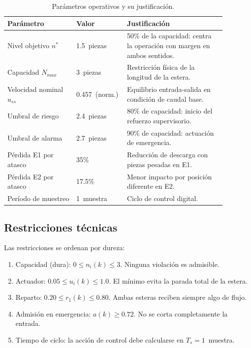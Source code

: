 \begin{table}[H]
\centering
\small
\caption{Parámetros operativos y su justificación.}
\label{tab:params_op}
\begin{tabular}{@{}P{0.30\linewidth}P{0.15\linewidth}P{0.43\linewidth}@{}}
\toprule
Parámetro & Valor & Justificación \\ \midrule
Nivel objetivo $n^*$ & 1.5~piezas & 50\% de la capacidad: centra la operación con margen en ambos sentidos.\\
Capacidad $N_{max}$ & 3~piezas & Restricción física de la longitud de la estera.\\
Velocidad nominal $u_{ss}$ & 0.457~(norm.) & Equilibrio entrada-salida en condición de caudal base.\\
Umbral de riesgo & 2.4~piezas & 80\% de capacidad: inicio del refuerzo supervisorio.\\
Umbral de alarma & 2.7~piezas & 90\% de capacidad: actuación de emergencia.\\
Pérdida E1 por atasco & 35\% & Reducción de descarga con piezas pesadas en E1.\\
Pérdida E2 por atasco & 17.5\% & Menor impacto por posición diferente en E2.\\
Período de muestreo & 1~muestra & Ciclo de control digital.\\
\bottomrule
\end{tabular}
\end{table}

\subsection*{Restricciones técnicas}

Las restricciones se ordenan por dureza:

\begin{enumerate}
  \item Capacidad (dura): $0 \leq n_i(k) \leq 3$. Ninguna violación es admisible.
  \item Actuador: $0.05 \leq u_i(k) \leq 1.0$. El mínimo evita la parada total de la estera.
  \item Reparto: $0.20 \leq r_1(k) \leq 0.80$. Ambas esteras reciben siempre algo de flujo.
  \item Admisión en emergencia: $a(k) \geq 0.72$. No se corta completamente la entrada.
  \item Tiempo de ciclo: la acción de control debe calcularse en $T_s=1$~muestra.
\end{enumerate}

